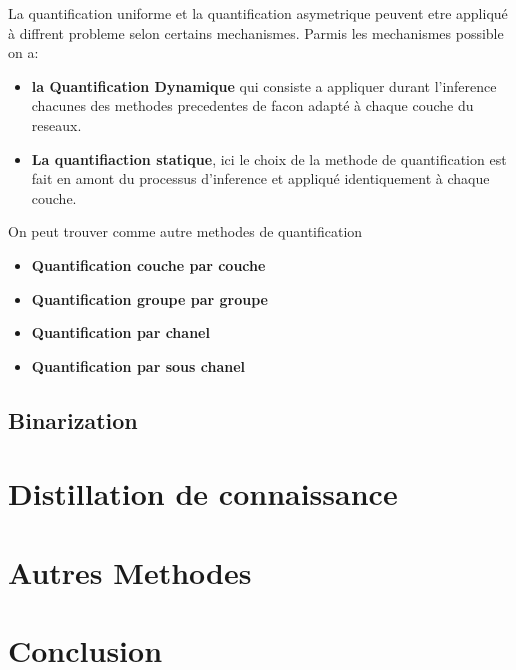 \documentclass[twoside,twocolumn]{article}
\begin{document}
La quantification uniforme et la quantification asymetrique peuvent etre appliqué  à diffrent probleme selon certains mechanismes. Parmis les mechanismes possible on a: 

\begin{itemize}
  \item \textbf{la Quantification Dynamique} qui consiste a appliquer durant l'inference chacunes des methodes precedentes de facon adapté à chaque couche du reseaux. 
  \item \textbf{La quantifiaction statique}, ici le choix de la methode de quantification est fait en amont du processus d'inference et appliqué identiquement à chaque couche.
\end{itemize}

On peut trouver comme autre methodes de quantification
\begin{itemize}
  \item \textbf{Quantification couche par couche}
  \item \textbf{Quantification groupe par groupe}
  \item \textbf{Quantification par chanel}
  \item \textbf{Quantification par sous chanel}
\end{itemize}
  
\subsection{Binarization}

\section{Distillation de connaissance} %


\section{Autres Methodes}%


\section{Conclusion}%



 

\end{document}
